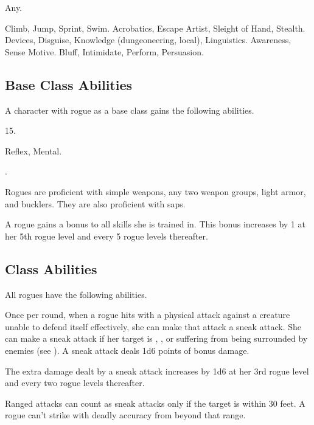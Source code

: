      Any.

     Climb, Jump, Sprint, Swim.
     Acrobatics, Escape Artist, Sleight of Hand, Stealth.
     Devices, Disguise, Knowledge (dungeoneering, local), Linguistics.
     Awareness, Sense Motive.
     Bluff, Intimidate, Perform, Persuasion.

    \subsection{Base Class Abilities}
        A character with rogue as a base class gains the following abilities.

         15.

          Reflex,  Mental.

         .

        Rogues are proficient with simple weapons, any two weapon groups, light armor, and bucklers.
        They are also proficient with saps.

        A rogue gains a  bonus to all skills she is trained in.
        This bonus increases by 1 at her 5th rogue level and every 5 rogue levels thereafter.

    \subsection{Class Abilities}
        All rogues have the following abilities.

        Once per round, when a rogue hits with a physical attack against a creature unable to defend itself effectively, she can make that attack a sneak attack.
        She can make a sneak attack if her target is \unaware, , or suffering  from being surrounded by enemies (see ).
        A sneak attack deals 1d6 points of bonus damage.

        The extra damage dealt by a sneak attack increases by 1d6 at her 3rd rogue level and every two rogue levels thereafter.

        Ranged attacks can count as sneak attacks only if the target is within 30 feet.
        A rogue can't strike with deadly accuracy from beyond that range.

